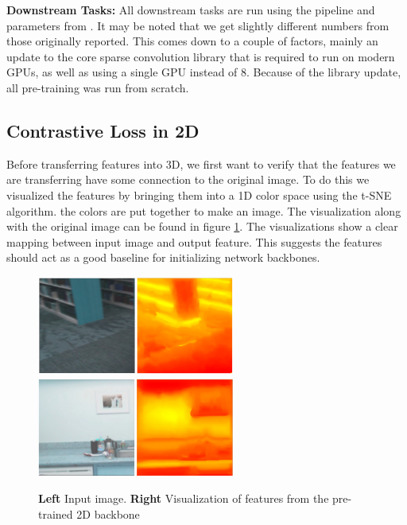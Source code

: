 \documentclass[10pt,twocolumn,letterpaper]{article}
\begin{document}
\textbf{Downstream Tasks:} All downstream tasks are run using the pipeline and parameters from \cite{hou2021Exploring}. It may be noted that we get slightly different numbers from those originally reported. This comes down to a couple of factors, mainly an update to the core sparse convolution library that is required to run on modern GPUs, as well as using a single GPU instead of 8. Because of the library update, all pre-training was run from scratch.

\subsection{Contrastive Loss in 2D}
\label{sec:results:2d}

Before transferring features into 3D, we first want to verify that the features we are transferring have some connection to the original image. To do this we visualized the features by bringing them into a 1D color space using the t-SNE \cite{maaten2008Visualizing} algorithm. the colors are put together to make an image. The visualization along with the original image can be found in figure \ref{fig:features2dvis}. The visualizations show a clear mapping between input image and output feature. This suggests the features should act as a good baseline for initializing network backbones.

\begin{figure}
    \centering
    \includegraphics[width=6.5cm]{images/experiments/25.02.2022-image-pretrain-vis2.png}
    \includegraphics[width=6.5cm]{images/experiments/25.02.2022-image-pretrain-vis1.png}
    \caption{\textbf{Left} Input image. \textbf{Right} Visualization of features from the pre-trained 2D backbone}
    \label{fig:features2dvis}
\end{figure}
\end{document}
